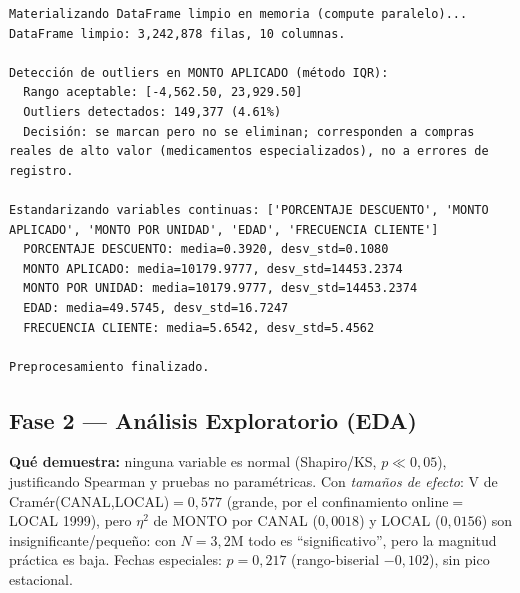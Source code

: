 \documentclass[12pt,letterpaper]{article}
\begin{document}
\begin{Verbatim}[breaklines=true,breakanywhere=true,fontsize=\scriptsize,breaksymbolleft={\tiny\ensuremath{\hookrightarrow}}]
Materializando DataFrame limpio en memoria (compute paralelo)...
DataFrame limpio: 3,242,878 filas, 10 columnas.

Detección de outliers en MONTO APLICADO (método IQR):
  Rango aceptable: [-4,562.50, 23,929.50]
  Outliers detectados: 149,377 (4.61%)
  Decisión: se marcan pero no se eliminan; corresponden a compras reales de alto valor (medicamentos especializados), no a errores de registro.

Estandarizando variables continuas: ['PORCENTAJE DESCUENTO', 'MONTO APLICADO', 'MONTO POR UNIDAD', 'EDAD', 'FRECUENCIA CLIENTE']
  PORCENTAJE DESCUENTO: media=0.3920, desv_std=0.1080
  MONTO APLICADO: media=10179.9777, desv_std=14453.2374
  MONTO POR UNIDAD: media=10179.9777, desv_std=14453.2374
  EDAD: media=49.5745, desv_std=16.7247
  FRECUENCIA CLIENTE: media=5.6542, desv_std=5.4562

Preprocesamiento finalizado.
\end{Verbatim}


\subsection*{Fase 2 --- Análisis Exploratorio (EDA)}
\textbf{Qué demuestra:} ninguna variable es normal (Shapiro/KS, $p\ll0{,}05$), justificando Spearman
y pruebas no paramétricas. Con \textit{tamaños de efecto}: V de Cramér(CANAL,LOCAL)$=0{,}577$ (grande,
por el confinamiento online$=$LOCAL 1999), pero $\eta^2$ de MONTO por CANAL ($0{,}0018$) y LOCAL
($0{,}0156$) son insignificante/pequeño: con $N=3{,}2$M todo es ``significativo'', pero la magnitud
práctica es baja. Fechas especiales: $p=0{,}217$ (rango-biserial $-0{,}102$), sin pico estacional.
\end{document}
